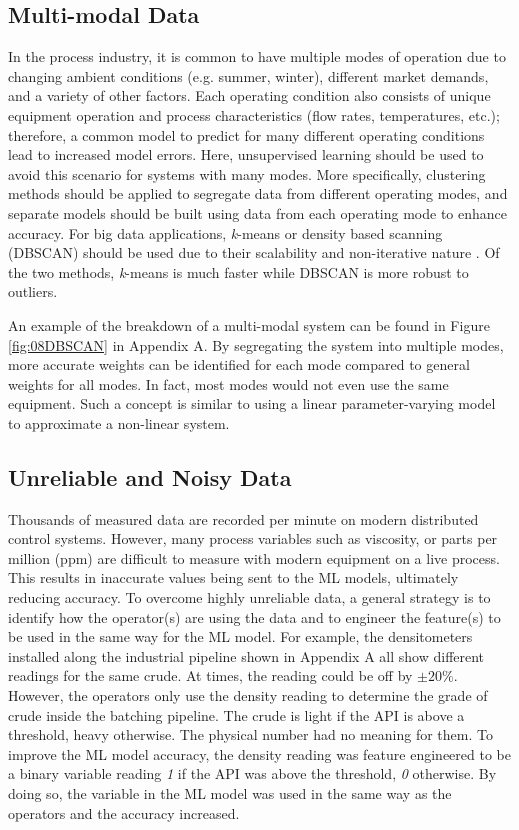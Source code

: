 \subsection{Multi-modal Data}
In the process industry, it is common to have multiple modes of operation due to changing ambient conditions (e.g. summer, winter), different market demands, and a variety of other factors.  Each operating condition also consists of unique equipment operation and process characteristics (flow rates, temperatures, etc.); therefore, a common model to predict for many different operating conditions lead to increased model errors.  Here, unsupervised learning should be used to avoid this scenario for systems with many modes.  More specifically, clustering methods should be applied to segregate data from different operating modes, and separate models should be built using data from each operating mode to enhance accuracy.  For big data applications, \textit{k}-means or density based scanning (DBSCAN) should be used due to their scalability and non-iterative nature \cite{clustering_complexity}. Of the two methods, \textit{k}-means is much faster while DBSCAN is more robust to outliers.

An example of the breakdown of a multi-modal system can be found in Figure \ref{fig:08DBSCAN} in Appendix A.  By segregating the system into multiple modes, more accurate weights can be identified for each mode compared to general weights for all modes.  In fact, most modes would not even use the same equipment.  Such a concept is similar to using a linear parameter-varying model to approximate a non-linear system.  

\subsection{Unreliable and Noisy Data}
Thousands of measured data are recorded per minute on modern distributed control systems. However, many process variables such as viscosity, or parts per million (ppm) are difficult to measure with modern equipment on a live process. This results in inaccurate values being sent to the ML models, ultimately reducing accuracy.  To overcome highly unreliable data, a general strategy is to identify how the operator(s) are using the data and to engineer the feature(s) to be used in the same way for the ML model.  For example, the densitometers installed along the industrial pipeline shown in Appendix A all show different readings for the same crude. At times, the reading could be off by $\pm 20\%$. However, the operators only use the density reading to determine the grade of crude inside the batching pipeline. The crude is light if the API is above a threshold, heavy otherwise.  The physical number had no meaning for them.  To improve the ML model accuracy, the density reading was feature engineered to be a binary variable reading \textit{1} if the API was above the threshold, \textit{0} otherwise.  By doing so, the variable in the ML model was used in the same way as the operators and the accuracy increased.

